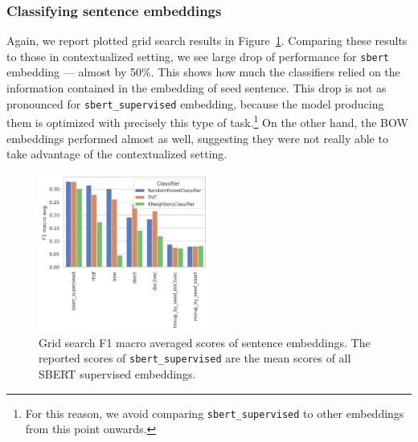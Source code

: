 \documentclass[11pt]{article}
\newcommand{\Embed}[1]{\texttt{#1}}
\begin{document}
\subsubsection{Classifying sentence embeddings}

Again, we report plotted grid search results in
Figure~\ref{fig:cls_gs_no_context_embed_comparison}. Comparing these results to
those in contextualized setting, we see large drop of performance for
\Embed{sbert} embedding --- almost by 50\%. This shows how much the classifiers
relied on the information contained in the embedding of seed sentence. This
drop is not as pronounced for \Embed{sbert\_supervised} embedding, because the
model producing them is optimized with precisely this type of
task.\footnote{For this reason, we avoid comparing \Embed{sbert\_supervised} to
other embeddings from this point onwards.} On the other hand, the BOW
embeddings performed almost as well, suggesting they were not really able to
take advantage of the contextualized setting.

\begin{figure}[htp]
  \centering
  \includegraphics[width=0.5\textwidth]{./figs/cls_gs_no_context_embed_comparison.png}

  \caption{Grid search F1 macro averaged scores of sentence embeddings. The
  reported scores of \Embed{sbert\_supervised} are the mean scores
  of all SBERT supervised
  embeddings.}\label{fig:cls_gs_no_context_embed_comparison}

\end{figure}
\end{document}
